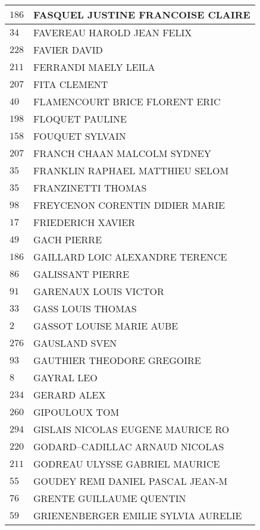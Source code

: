 \begin{xltabular}{\linewidth}{|l|X|}
    \hline
    $186$ & FASQUEL JUSTINE FRANCOISE CLAIRE \\
    \hline
    $34$ & FAVEREAU HAROLD JEAN FELIX \\
    \hline
    $228$ & FAVIER DAVID \\
    \hline
    $211$ & FERRANDI MAELY LEILA \\
    \hline
    $207$ & FITA CLEMENT \\
    \hline
    $40$ & FLAMENCOURT BRICE FLORENT ERIC \\
    \hline
    $198$ & FLOQUET PAULINE \\
    \hline
    $158$ & FOUQUET SYLVAIN \\
    \hline
    $207$ & FRANCH CHAAN MALCOLM SYDNEY \\
    \hline
    $35$ & FRANKLIN RAPHAEL MATTHIEU SELOM \\
    \hline
    $35$ & FRANZINETTI THOMAS \\
    \hline
    $98$ & FREYCENON CORENTIN DIDIER MARIE \\
    \hline
    $17$ & FRIEDERICH XAVIER \\
    \hline
    $49$ & GACH PIERRE \\
    \hline
    $186$ & GAILLARD LOIC ALEXANDRE TERENCE \\
    \hline
    $86$ & GALISSANT PIERRE \\
    \hline
    $91$ & GARENAUX LOUIS VICTOR \\
    \hline
    $33$ & GASS LOUIS THOMAS \\
    \hline
    $2$ & GASSOT LOUISE MARIE AUBE \\
    \hline
    $276$ & GAUSLAND SVEN \\
    \hline
    $93$ & GAUTHIER THEODORE GREGOIRE \\
    \hline
    $8$ & GAYRAL LEO \\
    \hline
    $234$ & GERARD ALEX \\
    \hline
    $260$ & GIPOULOUX TOM \\
    \hline
    $294$ & GISLAIS NICOLAS EUGENE MAURICE RO \\
    \hline
    $220$ & GODARD--CADILLAC ARNAUD NICOLAS \\
    \hline
    $211$ & GODREAU ULYSSE GABRIEL MAURICE \\
    \hline
    $55$ & GOUDEY REMI DANIEL PASCAL JEAN-M \\
    \hline
    $76$ & GRENTE GUILLAUME QUENTIN \\
    \hline
    $59$ & GRIENENBERGER EMILIE SYLVIA AURELIE \\

\end{xltabular}
